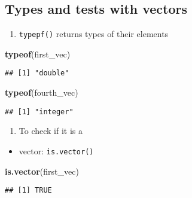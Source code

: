 \documentclass[]{book}
\newenvironment{Shaded}{\begin{snugshade}}{\end{snugshade}}
\newcommand{\KeywordTok}[1]{\textcolor[rgb]{0.13,0.29,0.53}{\textbf{#1}}}
\newcommand{\NormalTok}[1]{#1}
\providecommand{\tightlist}{%
  \setlength{\itemsep}{0pt}\setlength{\parskip}{0pt}}
\begin{document}
\hypertarget{types-and-tests-with-vectors}{%
\subsection{Types and tests with vectors}\label{types-and-tests-with-vectors}}

\begin{enumerate}
\def\labelenumi{\arabic{enumi}.}
\tightlist
\item
  \texttt{typepf()} returns types of their elements
\end{enumerate}

\begin{Shaded}
\begin{Highlighting}[]
\KeywordTok{typeof}\NormalTok{(first_vec)}
\end{Highlighting}
\end{Shaded}

\begin{verbatim}
## [1] "double"
\end{verbatim}

\begin{Shaded}
\begin{Highlighting}[]
\KeywordTok{typeof}\NormalTok{(fourth_vec)}
\end{Highlighting}
\end{Shaded}

\begin{verbatim}
## [1] "integer"
\end{verbatim}

\begin{enumerate}
\def\labelenumi{\arabic{enumi}.}
\setcounter{enumi}{1}
\tightlist
\item
  To check if it is a
\end{enumerate}

\begin{itemize}
\tightlist
\item
  vector: \texttt{is.vector()}
\end{itemize}

\begin{Shaded}
\begin{Highlighting}[]
\KeywordTok{is.vector}\NormalTok{(first_vec)}
\end{Highlighting}
\end{Shaded}

\begin{verbatim}
## [1] TRUE
\end{verbatim}
\end{document}
